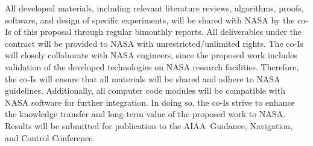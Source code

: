 \documentclass[letter,onecolumn,12pt]{aiaa-tc}
\newcommand{\1}{1_n}
\begin{document}
All developed materials, including relevant literature reviews, algorithms, proofs, software, and design of specific experiments, will be shared with NASA by the co-Is of this proposal through regular bimonthly reports. All deliverables under the contract will be provided to NASA with unrestricted/unlimited rights. The co-Is will closely collaborate with NASA engineers, since the proposed work includes validation of the developed technologies on NASA research facilities. Therefore, the co-Is will ensure that all materials will be shared and adhere to NASA guidelines. Additionally, all computer code modules will be compatible with NASA software for further integration. In doing so, the co-Is strive to enhance the knowledge transfer and long-term value of the proposed work to NASA. Results will be submitted for publication to the AIAA~Guidance, Navigation, and Control Conference.






\clearpage
{}


\end{document}
